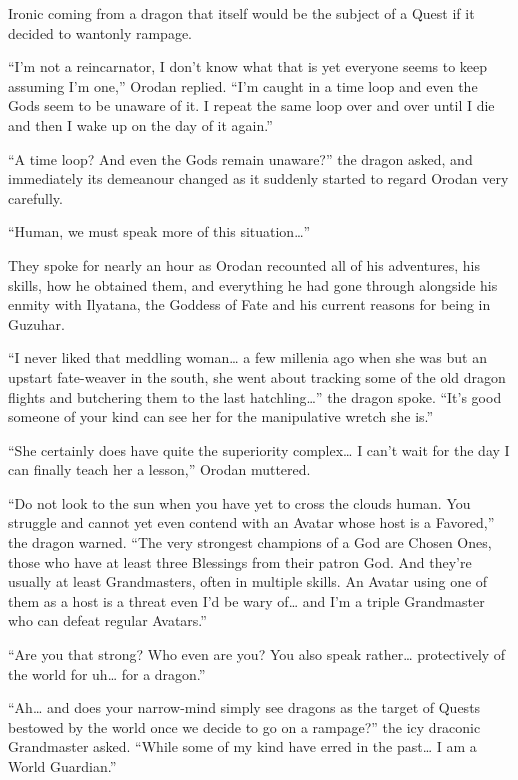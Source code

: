 \documentclass[a4paper,10pt]{book}
\begin{document}
Ironic coming from a dragon that itself would be the subject of a Quest if it decided to wantonly rampage.\par
“I’m not a reincarnator, I don’t know what that is yet everyone seems to keep assuming I’m one,” Orodan replied. “I’m caught in a time loop and even the Gods seem to be unaware of it. I repeat the same loop over and over until I die and then I wake up on the day of it again.”\par
“A time loop? And even the Gods remain unaware?” the dragon asked, and immediately its demeanour changed as it suddenly started to regard Orodan very carefully.\par
“Human, we must speak more of this situation…”\par
\par
They spoke for nearly an hour as Orodan recounted all of his adventures, his skills, how he obtained them, and everything he had gone through alongside his enmity with Ilyatana, the Goddess of Fate and his current reasons for being in Guzuhar.\par
“I never liked that meddling woman… a few millenia ago when she was but an upstart fate-weaver in the south, she went about tracking some of the old dragon flights and butchering them to the last hatchling…” the dragon spoke. “It’s good someone of your kind can see her for the manipulative wretch she is.”\par
“She certainly does have quite the superiority complex… I can’t wait for the day I can finally teach her a lesson,” Orodan muttered.\par
“Do not look to the sun when you have yet to cross the clouds human. You struggle and cannot yet even contend with an Avatar whose host is a Favored,” the dragon warned. “The very strongest champions of a God are Chosen Ones, those who have at least three Blessings from their patron God. And they’re usually at least Grandmasters, often in multiple skills. An Avatar using one of them as a host is a threat even I’d be wary of… and I’m a triple Grandmaster who can defeat regular Avatars.”\par
“Are you that strong? Who even are you? You also speak rather… protectively of the world for uh… for a dragon.”\par
“Ah… and does your narrow-mind simply see dragons as the target of Quests bestowed by the world once we decide to go on a rampage?” the icy draconic Grandmaster asked. “While some of my kind have erred in the past… I am a World Guardian.”\par
\end{document}
